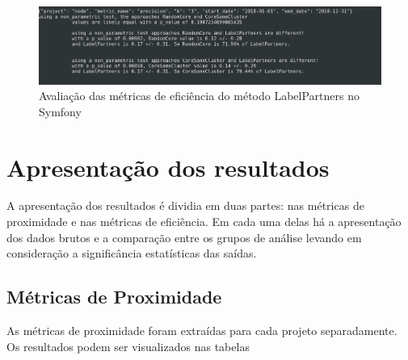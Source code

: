\documentclass[12pt,openany,oneside,a4paper,english,brazil]{abntbibufjf}
\begin{document}
  \begin{figure}[!htbp]
      \centering
      \includegraphics[width=\textwidth]{metric-evaluation}
      \caption{Avaliação das métricas de eficiência do método LabelPartners no Symfony}\label{fig:metric-evaluation}
  \end{figure}

  \section{Apresentação dos resultados}\label{sec:apresentacao}
  A apresentação dos resultados é dividia em duas partes: nas métricas de proximidade e nas métricas de eficiência. Em cada uma delas há a apresentação dos dados brutos e a comparação entre os grupos de análise levando em consideração a significância estatísticas das saídas.

  \subsection{Métricas de Proximidade}

  As métricas de proximidade foram extraídas para cada projeto separadamente. Os resultados podem ser visualizados nas tabelas
\end{document}
